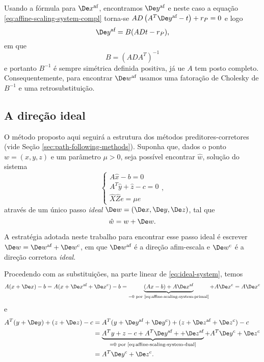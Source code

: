 Usando a fórmula para   $\dex$, encontramos $\dey$ e neste caso a equação
\eqref{eq:affine-scaling-system-compl} torna-se $AD\left(A^T\dey - t\right) +
r_P = 0$ e logo
\begin{equation}
\label{eq:de_y}
\dey = B(ADt - r_P),
\end{equation}
em que \begin{equation}
\label{eq:define-B}
B = (ADA^T)^{-1}
\end{equation} e portanto $B^{-1}$ é sempre simétrica definida positiva, já ue $A$ tem posto completo.
Consequentemente, para encontrar $\dew$ usamos uma fatoração de 
Cholesky de $B^{-1}$ e uma retrosubstituição.

\subsection{A direção ideal}

O método proposto aqui seguirá a estrutura dos  métodos preditores-corretores
(vide Seção \ref{sec:path-following-methods}). Suponha que, dados o ponto $w =
(x,y,z)$ e um parâmetro  $\mu>0$, seja possível  encontrar $\hat{w}$, solução
do sistema
\begin{equation}
	\label{eq:ideal-system}
\begin{cases} 
A\hat{x} -b = 0 \\
A^T\hat{y} +\hat{z} -c = 0 \\
\hat{X}\hat{Z}e = \mu e
\end{cases},
\end{equation}
através de um único
passo \emph{ideal}
 $\Dew = (\Dex,\Dey,\Dez)$, tal que \[ \hat{w} =
w+\Dew.\]

A estratégia adotada neste trabalho para encontrar esse passo ideal é  escrever
$\Dew = \dew + \Decow$, em que  $\dew$ é a direção afim-escala e $\Decow$ é a direção corretora 
\emph{ideal}.

Procedendo com as substituições, na parte linear de \eqref{eq:ideal-system},
temos
\[ A(x+\Dex) - b = A(x+\dex + \Decox) - b = \underbrace{(Ax - b) + A\dex}_{=0
\text{ por \eqref{eq:affine-scaling-system-primal}}} + A\Decox = A\Decox \] 
e
\begin{align*}
A^T(y+\Dey) + (z+\Dez) - c &= A^T(y+\dey+\Decoy) + (z+\dez+\Decoz) - c \\
						  &= \underbrace{A^Ty + z - c + A^T\dey+ +\dez}_{=0 
						  \text{ por \eqref{eq:affine-scaling-system-dual}}} +
						   A^T\Decoy +\Decoz \\
						  &=  A^T\Decoy +\Decoz.
\end{align*} 

